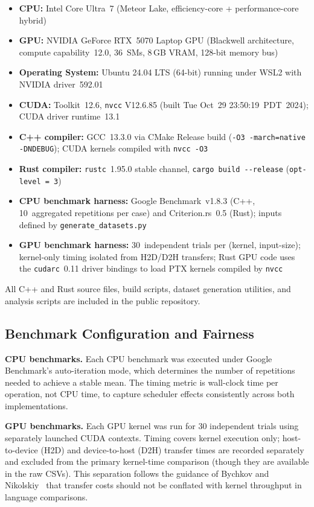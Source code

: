 \documentclass{article}
\begin{document}
\begin{itemize}[noitemsep]
  \item \textbf{CPU:} Intel Core Ultra~7 (Meteor Lake, efficiency-core + performance-core hybrid)
  \item \textbf{GPU:} NVIDIA GeForce RTX~5070 Laptop GPU (Blackwell
    architecture, compute capability~12.0, 36~SMs, 8\,GB VRAM, 128-bit
    memory bus)
  \item \textbf{Operating System:} Ubuntu 24.04 LTS (64-bit) running under
    WSL2 with NVIDIA driver~592.01
  \item \textbf{CUDA:} Toolkit~12.6, \texttt{nvcc} V12.6.85
    (built Tue Oct~29 23:50:19~PDT~2024); CUDA driver runtime~13.1
  \item \textbf{C++ compiler:} GCC~13.3.0 via CMake Release build
    (\texttt{-O3 -march=native -DNDEBUG}); CUDA kernels compiled with
    \texttt{nvcc -O3}
  \item \textbf{Rust compiler:} \texttt{rustc}~1.95.0 stable channel,
    \texttt{cargo build -{}-release} (\texttt{opt-level = 3})
  \item \textbf{CPU benchmark harness:} Google Benchmark~v1.8.3 (C++,
    10~aggregated repetitions per case) and Criterion.rs~0.5 (Rust);
    inputs defined by \texttt{generate\_datasets.py}
  \item \textbf{GPU benchmark harness:} 30~independent trials per
    (kernel, input-size); kernel-only timing isolated from H2D/D2H
    transfers; Rust GPU code uses the \texttt{cudarc}~0.11 driver
    bindings to load PTX kernels compiled by \texttt{nvcc}
\end{itemize}

All C++ and Rust source files, build scripts, dataset generation utilities,
and analysis scripts are included in the public repository.

\subsection{Benchmark Configuration and Fairness}

\textbf{CPU benchmarks.}
Each CPU benchmark was executed under Google Benchmark's auto-iteration
mode, which determines the number of repetitions needed to achieve a stable
mean.
The timing metric is wall-clock time per operation, not CPU time, to
capture scheduler effects consistently across both implementations.

\textbf{GPU benchmarks.}
Each GPU kernel was run for 30 independent trials using separately
launched CUDA contexts.
Timing covers kernel execution only; host-to-device (H2D) and
device-to-host (D2H) transfer times are recorded separately and excluded
from the primary kernel-time comparison (though they are available in the
raw CSVs).
This separation follows the guidance of Bychkov and Nikolskiy~\cite{bychkov2022rust}
that transfer costs should not be conflated with kernel throughput in
language comparisons.
\end{document}
